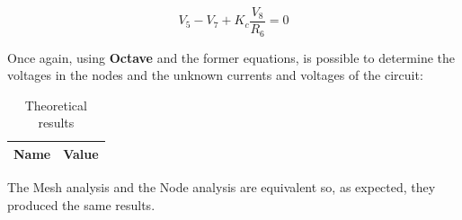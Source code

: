 \begin{equation}
  V_5 - V_7 + K_c\frac{V_8}{R_6} = 0
\end{equation}

Once again, using {\bf Octave} and the former equations, is possible to determine the voltages in the nodes and the unknown currents and voltages of the circuit:

\begin{table}[H]
  \centering
  \begin{tabular}{|c|c|}
    \hline
        {\bf Name} & {\bf Value} \\
        \hline
        \hline
        
        \hline
  \end{tabular}
  \caption{Theoretical results}
  \label{node_res}
\end{table} 

The Mesh analysis and the Node analysis are equivalent so, as expected, they produced the same results.



